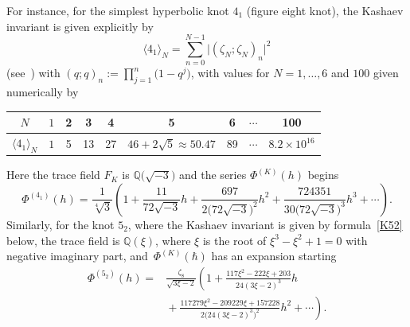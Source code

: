 \documentclass[pdftex]{sigma}
\numberwithin{equation}{section}
\def\BQ{\mathbb Q}
\def\la{\langle}
\def\ra{\rangle}
\def\z{\zeta}
\def\z{\zeta}
\def\be{\begin{equation}}
\def\ee{\end{equation}}
\begin{document}
For instance, for the simplest hyperbolic knot $4_1$ (figure eight knot),
the Kashaev invariant is given explicitly by
\be
\label{J0for41}
\la 4_1\ra_N = \sum_{n=0}^{N-1} \bigl|(\z_N;\z_N)_n\bigr|^2
\ee
(see~\cite[equation~(2.2)]{K97})
with $(q;q)_n:=\prod_{j=1}^n\big(1-q^j\big)$, with values for $N=1,\dots,6$ and $100$
given numerically by
\begin{center}
 \def\arraystretch{1.5}
 \begin{tabular}{c|cccccccc}
$N$ & $ 1 $ & 2 & 3 & 4 & 5 & 6 & $ \cdots $ & 100 \\ \hline
$\la 4_1\ra_N$ & $ 1 $ & 5 & 13 & 27 & $46+2\sqrt5\approx50.47$ & 89
& $ \cdots $ & $8.2\times 10^{16}$ \\
 \end{tabular}
\end{center}
Here the trace field $F_K$ is $\BQ\big(\sqrt{-3}\big)$ and the series $\Phi^{(K)}(h)$ begins
\be
\label{as41}
\Phi^{(4_1)}(h)= \frac1{\sqrt[4]{3}}
\left(1 + \frac{11}{72\sqrt{-3}} h + \frac{697}{2 \big(72\sqrt{-3}\big)^2} h^2
 + \frac{724351}{30 \big(72\sqrt{-3}\big)^3} h^3 +\cdots\right) .
\ee
Similarly, for the knot $5_2$, where the Kashaev invariant is given by
formula~\eqref{K52} below, the trace field is $\BQ(\xi)$, where $\xi$ is the
root of $\xi^3-\xi^2+1=0$ with negative imaginary part, and~$\Phi^{(K)}(\hbar)$
has an expansion starting
\begin{align}
\Phi^{(5_2)}(h) ={}& \frac{\z_8}{\sqrt{3\xi-2}}
\left(1 + \frac{117\xi^2-222\xi+203}{24(3\xi-2)^3}h\right.\nonumber\\
&\left. {}  + \frac{117279\xi^2 - 209229\xi + 157228}{2\big(24(3\xi-2)^3\big)^2}h^2
 + \cdots\right).\label{as52}
\end{align}
\end{document}
